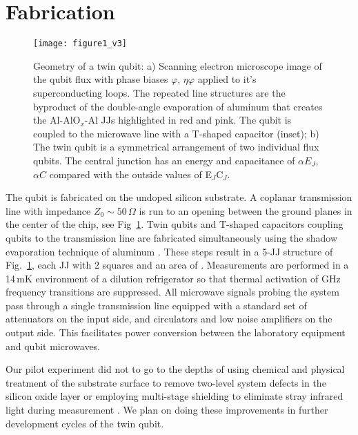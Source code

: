 \section{Fabrication}


\begin{figure}[h]
  \texttt{[image: figure1\_v3]}
  \caption{\small Geometry of a twin qubit: a) Scanning electron microscope image
    of  the  qubit flux  with  phase  biases  $ \varphi  $,  $  \eta\varphi  $ applied  to  it's
    superconducting loops. The repeated line  structures are the byproduct of the
    double-angle  evaporation  of aluminum  that  creates  the Al-AlO$_x$-Al  JJs
    highlighted in red and pink. The qubit  is coupled to the microwave line with
    a T-shaped capacitor (inset); b) The  twin qubit is a symmetrical arrangement
    of  two individual  flux  qubits.  The  central junction  has  an energy  and
    capacitance  of  $ \alpha  E_{J}$,  $\alpha  C$ compared  with  the  outside values  of
    E$_J$C$_J$.}
  \label{fig:setup}
\end{figure}

\noindent The qubit  is fabricated on the undoped silicon  substrate.  A coplanar
transmission line with impedance  $ Z_{0} \sim 50\,\Omega $ is run  to an opening between
the ground planes in the center of the chip, see Fig~\ref{fig:setup}. Twin qubits
and T-shaped capacitors  coupling qubits to the transmission  line are fabricated
simultaneously   using    the   shadow   evaporation   technique    of   aluminum
\cite{wu2013}. These  steps result in  a 5-JJ structure  of Fig.~\ref{fig:setup},
each JJ with 2 squares and  an area of .  Measurements are
performed in  a 14\,mK  environment of  a dilution  refrigerator so  that thermal
activation of  GHz frequency transitions  are suppressed.  All  microwave signals
probing the system pass through a  single transmission line equipped with
a standard set  of attenuators on the  input side, and circulators  and low noise
amplifiers on  the output  side.  This facilitates  power conversion  between the
laboratory equipment and qubit microwaves.

Our pilot experiment did  not to go to the depths of  using chemical and physical
treatment of  the substrate  surface to  remove two-level  system defects  in the
silicon  oxide layer  \cite{earnest2018}  or employing  multi-stage shielding  to
eliminate  stray infrared  light  during  measurement \cite{barends2011}. We plan on doing these improvements in further development cycles  of the twin qubit.





